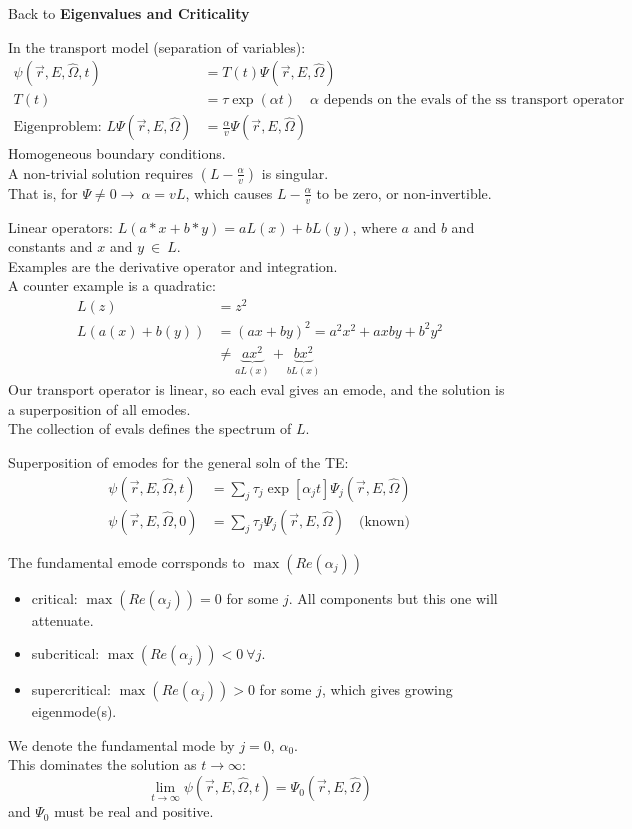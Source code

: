 \documentclass[12pt]{article}
\newcommand{\rvec}{\ensuremath{\vec{r}}}
\newcommand{\vOmega}{\ensuremath{\hat{\Omega}}}
\begin{document}
\clearpage
Back to \textbf{Eigenvalues and Criticality}

In the transport model (separation of variables):
\begin{align*}
\psi(\rvec, E, \vOmega, t) &= T(t) \Psi(\rvec, E, \vOmega) \\
T(t) &= \tau \exp(\alpha t) \quad \alpha \text{ depends on the evals of the ss transport operator} \\
\text{Eigenproblem: }L\Psi(\rvec, E, \vOmega) &= \frac{\alpha}{v}\Psi(\rvec, E, \vOmega)
\end{align*}
%
Homogeneous boundary conditions.\\
A non-trivial solution requires $(L - \frac{\alpha}{v})$ is singular. \\
That is, for $\Psi \neq 0 \rightarrow \: \alpha = v L$, which causes $L - \frac{\alpha}{v}$ to be zero, or non-invertible.

Linear operators: $L(a*x + b*y) = aL(x) + bL(y)$, where $a$ and $b$ and constants and $x$ and $y \: \in \: L$.\\
Examples are the derivative operator and integration. \\
A counter example is a quadratic:
\begin{align*}
L(z) &= z^2 \\
L(a(x) + b(y)) &= (ax + by)^2 = a^2 x^2 + axby + b^2 y^2 \\
& \neq \underbrace{a x^2}_{aL(x)} + \underbrace{b x^2}_{bL(x)}
\end{align*}
%
Our transport operator is linear, so each eval gives an emode, and the solution is a superposition of all emodes. \\
The collection of evals defines the spectrum of $L$.

Superposition of emodes for the general soln of the TE:
\begin{align*}
\psi(\rvec, E, \vOmega, t) &= \sum_{j} \tau_j \exp[\alpha_j t] \Psi_j(\rvec, E, \vOmega) \\
\psi(\rvec, E, \vOmega, 0) &= \sum_{j} \tau_j \Psi_j(\rvec, E, \vOmega) \quad \text{(known)}
\end{align*}

The fundamental emode corrsponds to $\max(Re(\alpha_j))$
\begin{itemize}
\item critical: $\max(Re(\alpha_j)) = 0$ for some $j$. All components but this one will attenuate. 
\item subcritical: $\max(Re(\alpha_j)) < 0 \: \forall j$.
\item supercritical: $\max(Re(\alpha_j)) > 0$ for some $j$, which gives growing eigenmode(s).
\end{itemize}
We denote the fundamental mode by $j=0$, $\alpha_0$. \\
This dominates the solution as $t \rightarrow \infty$:
\[\lim\limits_{t \to \infty} \psi(\rvec, E, \vOmega, t) = \Psi_0(\rvec, E, \vOmega)\]
and $\Psi_0$ must be real and positive.
\end{document}
